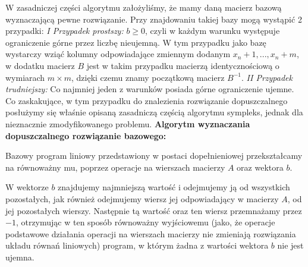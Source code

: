 \documentclass[licencjacka]{pracamgr}
\begin{document}
W zasadniczej części algorytmu założyliśmy, że mamy daną macierz bazową wyznaczającą pewne rozwiązanie. Przy znajdowaniu takiej bazy mogą wystąpić 2 przypadki:\newline\newline
%
\textit{I Przypadek prostszy:}\newline\newline
$b\ge0$, czyli w każdym warunku występuje ograniczenie górne przez liczbę nieujemną.
W tym przypadku jako bazę wystarczy wziąć kolumny odpowiadające zmiennym dodanym $x_n+1,...,x_n+m$, 
w dodatku macierz $B$ jest w takim przypadku macierzą identycznościową o wymiarach $m\times m$, dzięki czemu znamy początkową macierz $B^{-1}$.\newline\newline
%
\textit{II Przypadek trudniejszy:}\newline\newline
Co najmniej jeden z warunków posiada górne ograniczenie ujemne. Co zaskakujące, w tym przypadku do znalezienia rozwiązanie dopuszczalnego posłużymy się
właśnie opisaną zasadniczą częścią algorytmu sympleks, jednak dla nieznacznie zmodyfikowanego problemu.\newline\newline
%
\textbf{Algorytm wyznaczania dopuszczalnego rozwiązanie bazowego:}\newline

Bazowy program liniowy przedstawiony w postaci dopełnieniowej przekształcamy na równoważny mu, poprzez operacje na wierszach macierzy $A$ oraz wektora $b$.

W wektorze $b$ znajdujemy najmniejszą wartość i odejmujemy ją od wszystkich pozostałych, jak również odejmujemy wiersz jej odpowiadający w macierzy $A$, od jej pozostałych wierszy.
Następnie tą wartość oraz ten wiersz przemnażamy przez $-1$, otrzymując w ten sposób równoważny wyjściowemu
(jako, że operacje podstawowe działania operacji na wierszach macierzy nie zmieniają rozwiązania układu równań liniowych) program, w którym żadna z wartości wektora $b$ nie jest ujemna.
\end{document}
